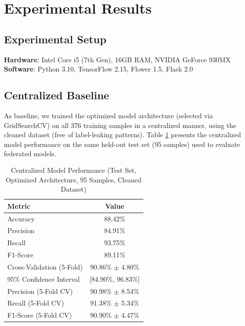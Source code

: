 \documentclass[conference]{IEEEtran}
\begin{document}
\section{Experimental Results}

\subsection{Experimental Setup}

\textbf{Hardware}: Intel Core i5 (7th Gen), 16GB RAM, NVIDIA GeForce 930MX \\
\textbf{Software}: Python 3.10, TensorFlow 2.15, Flower 1.5, Flask 2.0

\subsection{Centralized Baseline}

As baseline, we trained the optimized model architecture (selected via GridSearchCV) on all 376 training samples in a centralized manner, using the cleaned dataset (free of label-leaking patterns). Table \ref{tab:centralized} presents the centralized model performance on the same held-out test set (95 samples) used to evaluate federated models.

\begin{table}[h]
\centering
\caption{Centralized Model Performance (Test Set, Optimized Architecture, 95 Samples, Cleaned Dataset)}
\label{tab:centralized}
\begin{tabular}{@{}lc@{}}
\toprule
\textbf{Metric} & \textbf{Value} \\ \midrule
Accuracy & 88.42\% \\
Precision & 84.91\% \\
Recall & 93.75\% \\
F1-Score & 89.11\% \\
\midrule
Cross-Validation (5-Fold) & 90.86\% $\pm$ 4.80\% \\
95\% Confidence Interval & [84.90\%, 96.83\%] \\
Precision (5-Fold CV) & 90.98\% $\pm$ 8.54\% \\
Recall (5-Fold CV) & 91.38\% $\pm$ 5.34\% \\
F1-Score (5-Fold CV) & 90.90\% $\pm$ 4.47\% \\
\bottomrule
\end{tabular}
\end{table}
\end{document}
